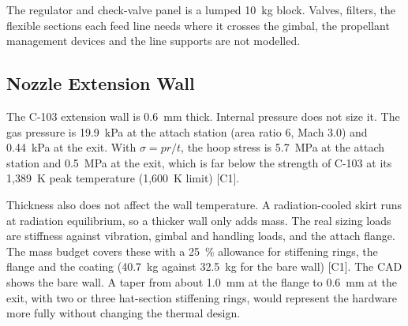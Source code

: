 The regulator and check-valve panel is a lumped 10~kg block. Valves, filters, the flexible sections each feed line needs
where it crosses the gimbal, the propellant management devices and the line supports are not modelled.

\begin{table}[htbp]\centering\small\caption{Feed and pressurization lines.}\label{cad-tab:lines}
\end{table}

\subsection{Nozzle Extension Wall}
The C-103 extension wall is 0.6~mm thick. Internal pressure does not size it. The gas pressure is 19.9~kPa at the
attach station (area ratio 6, Mach 3.0) and 0.44~kPa at the exit. With $\sigma = p r / t$, the hoop stress is 5.7~MPa
at the attach station and 0.5~MPa at the exit, which is far below the strength of C-103 at its 1,389~K peak temperature
(1,600~K limit) [C1].

Thickness also does not affect the wall temperature. A radiation-cooled skirt runs at radiation equilibrium, so a thicker
wall only adds mass. The real sizing loads are stiffness against vibration, gimbal and handling loads, and the attach
flange. The mass budget covers these with a 25~\% allowance for stiffening rings, the flange and the coating (40.7~kg
against 32.5~kg for the bare wall) [C1]. The CAD shows the bare wall. A taper from about 1.0~mm at the flange to 0.6~mm at
the exit, with two or three hat-section stiffening rings, would represent the hardware more fully without changing the
thermal design.

